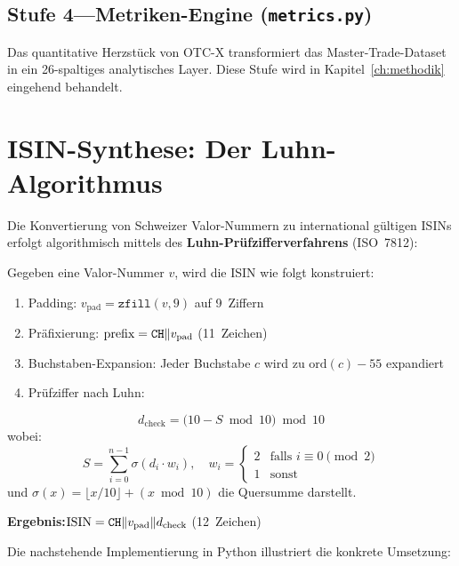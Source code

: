 \documentclass[11pt, a4paper, oneside, openany]{report}
\newcommand{\code}[1]{\texttt{\small\textcolor{DeepNavy}{#1}}}
\begin{document}
\subsection{Stufe 4\;---\;Metriken-Engine (\code{metrics.py})}

Das quantitative Herzstück von OTC-X transformiert das Master-Trade-Dataset in ein 26-spaltiges analytisches Layer. Diese Stufe wird in Kapitel~\ref{ch:methodik} eingehend behandelt.

\section{ISIN-Synthese: Der Luhn-Algorithmus}
\label{sec:luhn}

Die Konvertierung von Schweizer Valor-Nummern zu international gültigen ISINs erfolgt algorithmisch mittels des \textbf{Luhn-Prüfzifferverfahrens} (ISO~7812):

\begin{mathbox}
Gegeben eine Valor-Nummer $v$, wird die ISIN wie folgt konstruiert:
\begin{enumerate}
  \item Padding: $v_{\text{pad}} = \texttt{zfill}(v, 9)$ auf 9~Ziffern
  \item Präfixierung: $\text{prefix} = \text{\texttt{CH}} \| v_{\text{pad}}$ (11~Zeichen)
  \item Buchstaben-Expansion: Jeder Buchstabe $c$ wird zu $\text{ord}(c) - 55$ expandiert
  \item Prüfziffer nach Luhn:
\end{enumerate}
\[
  d_{\text{check}} = \bigl(10 - S \bmod 10\bigr) \bmod 10
\]
wobei:
\[
  S = \sum_{i=0}^{n-1} \sigma\!\left(d_i \cdot w_i\right), \quad w_i = \begin{cases} 2 & \text{falls } i \equiv 0 \pmod{2} \\ 1 & \text{sonst} \end{cases}
\]
und $\sigma(x) = \lfloor x/10 \rfloor + (x \bmod 10)$ die Quersumme darstellt.

\textbf{Ergebnis:}\;$\text{ISIN} = \text{\texttt{CH}} \| v_{\text{pad}} \| d_{\text{check}}$ (12~Zeichen)
\end{mathbox}

\noindent Die nachstehende Implementierung in Python illustriert die konkrete Umsetzung:
\end{document}
